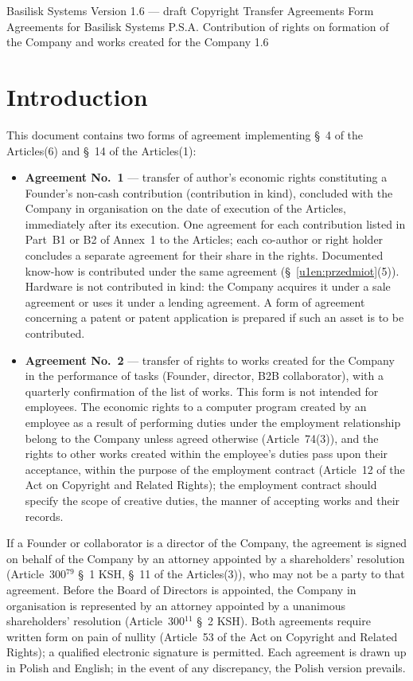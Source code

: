 \documentclass[12pt,a4paper]{report}
\newcommand{\USen}[1]{\S~#1 of the Articles}
\begin{document}

\BusinessPlanTitlePage
  {Basilisk Systems}
  {Version 1.6 --- draft}
  {Copyright Transfer Agreements}
  {Form Agreements for Basilisk Systems P.S.A.}
  {Contribution of rights on formation of the Company and works created for the Company}
  {1.6}

\tableofcontents
\newpage

\chapter*{Introduction}

This document contains two forms of agreement implementing \USen{4}(6) and \USen{14}(1):

\begin{itemize}
  \item \textbf{Agreement No.~1} --- transfer of author's economic rights constituting a Founder's non-cash contribution (contribution in kind), concluded with the Company in organisation on the date of execution of the Articles, immediately after its execution. One agreement for each contribution listed in Part~B1 or B2 of Annex~1 to the Articles; each co-author or right holder concludes a separate agreement for their share in the rights. Documented know-how is contributed under the same agreement (\S~\ref{u1en:przedmiot}(5)). Hardware is not contributed in kind: the Company acquires it under a sale agreement or uses it under a lending agreement. A form of agreement concerning a patent or patent application is prepared if such an asset is to be contributed.
  \item \textbf{Agreement No.~2} --- transfer of rights to works created for the Company in the performance of tasks (Founder, director, B2B collaborator), with a quarterly confirmation of the list of works. This form is not intended for employees. The economic rights to a computer program created by an employee as a result of performing duties under the employment relationship belong to the Company unless agreed otherwise (Article~74(3)), and the rights to other works created within the employee's duties pass upon their acceptance, within the purpose of the employment contract (Article~12 of the Act on Copyright and Related Rights); the employment contract should specify the scope of creative duties, the manner of accepting works and their records.
\end{itemize}

If a Founder or collaborator is a director of the Company, the agreement is signed on behalf of the Company by an attorney appointed by a shareholders' resolution (Article~300$^{79}$ \S~1 KSH, \USen{11}(3)), who may not be a party to that agreement. Before the Board of Directors is appointed, the Company in organisation is represented by an attorney appointed by a unanimous shareholders' resolution (Article~300$^{11}$ \S~2 KSH). Both agreements require written form on pain of nullity (Article~53 of the Act on Copyright and Related Rights); a qualified electronic signature is permitted. Each agreement is drawn up in Polish and English; in the event of any discrepancy, the Polish version prevails.
\end{document}
